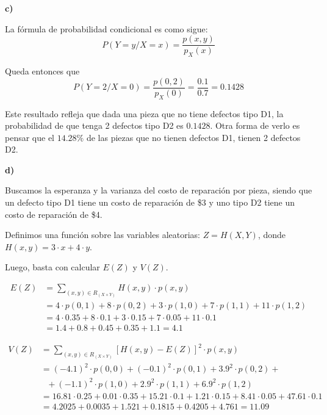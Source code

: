 \documentclass[11pt]{article}
\begin{document}
\textbf{c)}

La f\'ormula de probabilidad condicional es como sigue:
$$P(Y=y / X=x) = \frac{p(x,y)}{p_X(x)}$$

Queda entonces que
$$P(Y=2 / X=0) = \frac{p(0,2)}{p_X(0)} = \frac{0.1}{0.7} = 0.1428$$

Este resultado refleja que dada una pieza que no tiene defectos tipo D1, la probabilidad de que tenga 2 defectos tipo D2 es $0.1428$. 
Otra forma de verlo es pensar que el $14.28\%$ de las piezas que no tienen defectos D1, tienen 2 defectos D2.


\textbf{d)}

Buscamos la esperanza y la varianza del costo de reparaci\'on por pieza, siendo que un defecto tipo D1 tiene un costo de reparaci\'on de \$3 y uno tipo D2 tiene un costo de reparaci\'on de \$4.

Definimos una funci\'on sobre las variables aleatorias: $Z = H(X,Y)$, donde $H(x,y) = 3 \cdot x + 4 \cdot y$.

Luego, basta con calcular $E(Z)$ y $V(Z)$.

\begin{align*}
    E(Z) &= \sum_{(x,y) \in R_{(X \times Y)}} H(x,y) \cdot p(x,y) \\ 
         &= 4 \cdot p(0,1) + 8 \cdot p(0,2) + 3 \cdot p(1,0) + 7 \cdot p(1,1) + 11 \cdot p(1,2) \\
         &= 4 \cdot 0.35 + 8 \cdot 0.1 + 3 \cdot 0.15 + 7 \cdot 0.05 + 11 \cdot 0.1 \\
         &= 1.4 + 0.8 + 0.45 + 0.35 + 1.1 = 4.1
\end{align*}

\begin{align*}
    V(Z) &= \sum_{(x,y) \in R_{(X \times Y)}} [H(x,y) - E(Z)]^2 \cdot p(x,y) \\
         &= (-4.1)^2 \cdot p(0,0) + (-0.1)^2 \cdot p(0,1) + 3.9^2 \cdot p(0,2) + \\ &\ \ \ + (-1.1)^2 \cdot p(1,0) + 2.9^2 \cdot p(1,1) + 6.9^2 \cdot p(1,2) \\
         &= 16.81 \cdot 0.25 + 0.01 \cdot 0.35 + 15.21 \cdot 0.1 + 1.21 \cdot 0.15 + 8.41 \cdot 0.05 + 47.61 \cdot 0.1 \\
         &= 4.2025 + 0.0035 + 1.521 + 0.1815 + 0.4205 + 4.761 = 11.09
\end{align*}
\end{document}
